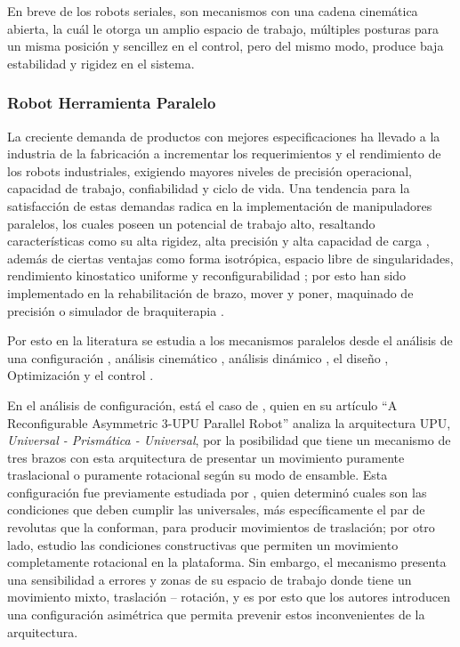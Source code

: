 En breve de los robots seriales, son mecanismos con una cadena cinemática abierta, la cuál le otorga un amplio espacio de trabajo, múltiples posturas para un misma posición y sencillez en el control, pero del mismo modo, produce baja estabilidad y rigidez en el sistema.

\subsubsection{Robot Herramienta Paralelo}
La creciente demanda de productos con mejores especificaciones ha llevado a la industria de la fabricación a incrementar los requerimientos y el rendimiento de los robots industriales, exigiendo mayores niveles de precisión operacional, capacidad de trabajo, confiabilidad y ciclo de vida. Una tendencia para la satisfacción de estas demandas radica en la implementación de manipuladores paralelos, los cuales poseen un potencial de trabajo alto, resaltando características como su alta rigidez, alta precisión y alta capacidad de carga \citep{zhang2009parallel}, además de ciertas ventajas como forma isotrópica, espacio libre de singularidades, rendimiento kinostatico uniforme y reconfigurabilidad \citep{lin2015design,ur2009kinematic,ZENG2014648}; por esto han sido implementado en la rehabilitación de brazo, mover y poner, maquinado de precisión o simulador de braquiterapia \citep{briot2009pantopteron,cardou2010dimensional,hoppner2015two,martini2015static}.

Por esto en la literatura se estudia a los mecanismos paralelos desde el análisis de una configuración \citep{sarabandi2018reconfigurable}, análisis cinemático \citep{gallardo2014application}, análisis dinámico \citep{xu2017dynamic}, el diseño \citep{li2018design}, Optimización \citep{kelaiaia2012multiobjective} y el control \citep{cazalilla2016hybrid}.

En el análisis de configuración, está el caso de \cite{sarabandi2018reconfigurable}, quien en su artículo \enquote{A Reconfigurable Asymmetric 3-UPU Parallel Robot} analiza la arquitectura UPU, \textit{Universal - Prismática - Universal}, por la posibilidad que tiene un mecanismo de tres brazos con esta arquitectura de presentar un movimiento puramente traslacional o puramente rotacional según su modo de ensamble. Esta configuración fue previamente estudiada por \cite{di1998translational}, quien determinó cuales son las condiciones que deben cumplir las universales, más específicamente el par de revolutas que la conforman, para producir movimientos de traslación; por otro lado, \cite{karouia2000three} estudio las condiciones constructivas que permiten un movimiento completamente rotacional en la plataforma. Sin embargo, el mecanismo presenta una sensibilidad a errores y zonas de su espacio de trabajo donde tiene un movimiento mixto,   traslación – rotación, y es por esto que los autores introducen una configuración asimétrica que permita prevenir estos inconvenientes de la arquitectura.

